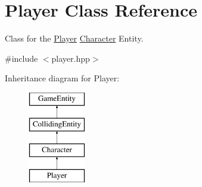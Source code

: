 \hypertarget{class_player}{}\section{Player Class Reference}
\label{class_player}


Class for the \mbox{\hyperlink{class_player}{Player}} \mbox{\hyperlink{class_character}{Character}} Entity.  




{\ttfamily \#include $<$player.\+hpp$>$}

Inheritance diagram for Player\+:\begin{figure}[H]
\begin{center}
\leavevmode
\includegraphics[height=4.000000cm]{class_player}
\end{center}
\end{figure}
